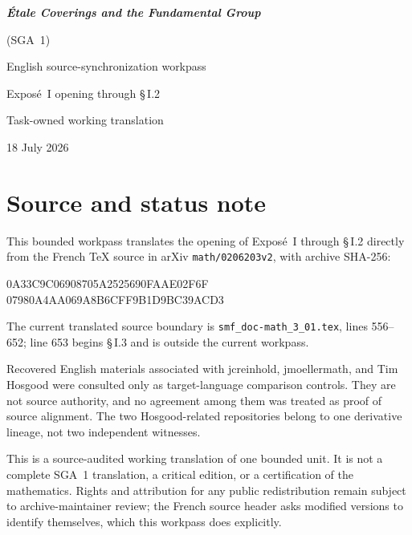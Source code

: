 \documentclass[11pt,oneside]{amsbook}
\begin{document}
\frontmatter
\begin{titlepage}
  \centering
  \vspace*{35mm}
  {\Huge\bfseries \textit{Étale Coverings and the Fundamental Group}\par}
  \vspace{3mm}
  {\LARGE (SGA~1)\par}
  \vspace{20mm}
  {\Large English source-synchronization workpass\par}
  \vspace{3mm}
  {\Large Exposé~I opening through \S\,I.2\par}
  \vfill
  {\large Task-owned working translation\par}
  \vspace{5mm}
  {\large 18 July 2026\par}
\end{titlepage}

\chapter*{Source and status note}

This bounded workpass translates the opening of Exposé~I through \S\,I.2 directly
from the French \TeX{} source in arXiv \texttt{math/0206203v2}, with archive
SHA-256:
\begin{center}
  \small\ttfamily
  0A33C9C06908705A2525690FAAE02F6F\\
  07980A4AA069A8B6CFF9B1D9BC39ACD3
\end{center}
The current translated source boundary is
\texttt{smf\_doc-math\_3\_01.tex}, lines 556--652; line 653 begins \S\,I.3
and is outside the current workpass.

Recovered English materials associated with jcreinhold, jmoellermath, and
Tim Hosgood were consulted only as target-language comparison controls.
They are not source authority, and no agreement among them was treated as
proof of source alignment.  The two Hosgood-related repositories belong to
one derivative lineage, not two independent witnesses.

This is a source-audited working translation of one bounded unit.  It is not
a complete SGA~1 translation, a critical edition, or a certification of the
mathematics.  Rights and attribution for any public redistribution remain
subject to archive-maintainer review; the French source header asks modified
versions to identify themselves, which this workpass does explicitly.
\end{document}
